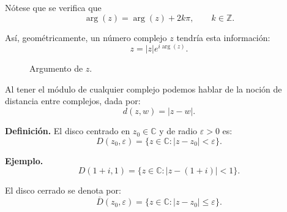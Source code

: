 \documentclass[a4paper,12pt]{article}
\begin{document}
\medskip
\noindent Nótese que se verifica que
\[
\arg(z) = \arg(z) + 2k\pi, \qquad k \in \mathbb{Z}.
\]

Así, geométricamente, un número complejo $z$ tendría esta información:
\[
z = |z| e^{i\arg(z)}.
\]

\begin{figure}[h]
\centering
{}

\medskip
{\small Argumento de \(z\).}
\end{figure}

Al tener el módulo de cualquier complejo podemos hablar de la noción de distancia entre complejos,
dada por:
\[
d(z,w) = |z-w|.
\]

\noindent\textbf{Definición.} El disco centrado en $z_0 \in \mathbb{C}$ y de radio $\varepsilon > 0$ es:
\[
D(z_0,\varepsilon) = \{ z \in \mathbb{C} : |z - z_0| < \varepsilon \}.
\]

\noindent\textbf{Ejemplo.} 
\[
D(1+i,1) = \{ z \in \mathbb{C} : |z-(1+i)| < 1 \}.
\]

El disco cerrado se denota por:
\[
\overline{D}(z_0,\varepsilon) = \{ z \in \mathbb{C} : |z - z_0| \leq \varepsilon \}.
\]
\end{document}
